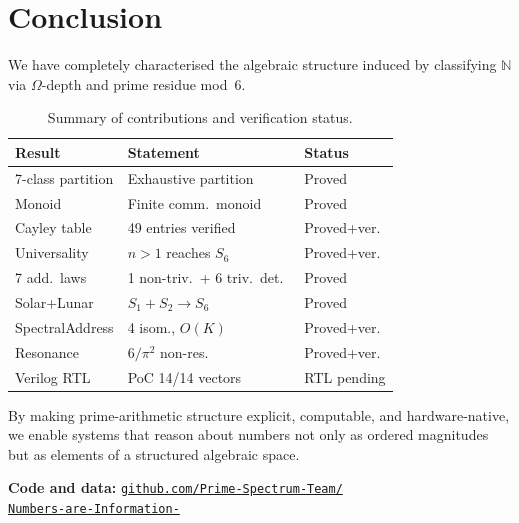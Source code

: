 \documentclass[10pt,twocolumn]{article}
\newcommand{\Om}{\Omega}
\newcommand{\N}{\mathbb{N}}
\newcommand{\repourl}{%
  \href{https://github.com/Prime-Spectrum-Team/Numbers-are-Information-.git}%
       {\small\texttt{github.com/Prime-Spectrum-Team/}\\\texttt{Numbers-are-Information-}}%
}
\begin{document}
\section{Conclusion}

We have completely characterised the algebraic structure induced by
classifying $\N$ via $\Om$-depth and prime residue mod~6.

\begin{table}[htbp]
\centering
\small
\setlength{\tabcolsep}{3pt}
\begin{tabularx}{\columnwidth}{@{}lXl@{}}
\toprule
Result & Statement & Status \\
\midrule
7-class partition & Exhaustive partition       & Proved \\
Monoid            & Finite comm.\ monoid       & Proved \\
Cayley table      & 49 entries verified         & Proved+ver. \\
Universality      & $n{>}1$ reaches $S_6$      & Proved+ver. \\
7 add.\ laws      & 1 non-triv.\ + 6 triv.\ det.\ & Proved \\
Solar+Lunar       & $S_1+S_2 \to S_6$          & Proved \\
SpectralAddress   & 4 isom., $O(K)$            & Proved+ver. \\
Resonance         & $6/\pi^2$ non-res.         & Proved+ver. \\
Verilog RTL       & PoC 14/14 vectors           & RTL pending \\
\bottomrule
\end{tabularx}
\caption{Summary of contributions and verification status.}
\end{table}

By making prime-arithmetic structure explicit, computable, and
hardware-native, we enable systems that reason about numbers not only as
ordered magnitudes but as elements of a structured algebraic space.

\smallskip
\noindent\textbf{Code and data:} \repourl
\end{document}
